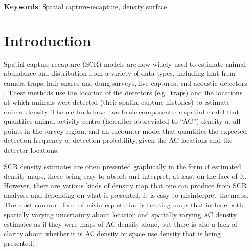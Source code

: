 \documentclass[10pt,a4paper]{article}
\begin{document}
\textbf{Keywords}: Spatial capture-recapture, density surface

\section{Introduction}

Spatial capture-recapture (SCR) models \citep*{Efford:04,Borchers+Efford:08, Royle+Young:08} are now widely used to estimate animal abundance and distribution from a variety of data types, including that from camera-traps, hair snares and dung surveys, live-captures, and acoustic detectors%
. These methods use the location of the detectors (e.g.\ traps) and the locations at which animals were detected (their spatial capture histories) to estimate animal density. The methods have two basic components: a spatial model that quantifies animal activity centre (hereafter abbreviated to ``AC'') density at all points in the survey region, and an encounter model that quantifies the expected detection frequency or detection probability, given the AC locations and the detector locations. 

SCR density estimates are often presented graphically in the form of estimated density maps, these being easy to absorb and interpret, at least on the face of it.  However, there are various kinds of density map that one can produce from SCR analyses and depending on what is presented, it is easy to misinterpret the maps. The most common form of misinterpretation is treating maps that include both spatially varying uncertainty about location and spatially varying AC density estimates as if they were maps of AC density alone, but there is also a lack of clarity about whether it is AC density or space use density that is being presented.

\end{document}
